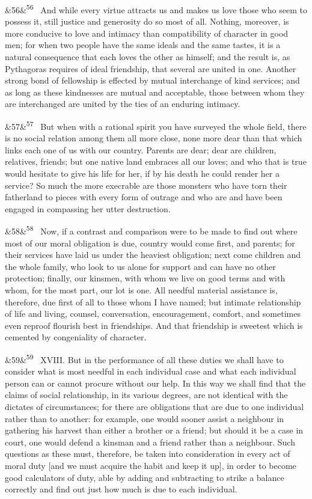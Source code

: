 \documentclass[12pt]{article}
\newcommand{\para}[1][]{\par\noindent\ifx&#1&\else\textsuperscript{\footnotesize #1}~\fi}
\begin{document}
\para[56] And while every virtue attracts us and makes us love those who seem to possess it, still justice and generosity do so most of all. Nothing, moreover, is more conducive to love and intimacy than compatibility of character in good men; for when two people have the same ideals and the same tastes, it is a natural consequence that each loves the other as himself; and the result is, as Pythagoras requires of ideal friendship, that several are united in one. Another strong bond of fellowship is effected by mutual interchange of kind services; and as long as these kindnesses are mutual and acceptable, those between whom they are interchanged are united by the ties of an enduring intimacy.

\para[57] But when with a rational spirit you have surveyed the whole field, there is no social relation among them all more close, none more dear than that which links each one of us with our country. Parents are dear; dear are children, relatives, friends; but one native land embraces all our loves; and who that is true would hesitate to give his life for her, if by his death he could render her a service? So much the more execrable are those monsters who have torn their fatherland to pieces with every form of outrage and who are and have been engaged in compassing her utter destruction.

\para[58] Now, if a contrast and comparison were to be made to find out where most of our moral obligation is due, country would come first, and parents; for their services have laid us under the heaviest obligation; next come children and the whole family, who look to us alone for support and can have no other protection; finally, our kinsmen, with whom we live on good terms and with whom, for the most part, our lot is one. All needful material assistance is, therefore, due first of all to those whom I have named; but intimate relationship of life and living, counsel, conversation, encouragement, comfort, and sometimes even reproof flourish best in friendships. And that friendship is sweetest which is cemented by congeniality of character.

\para[59] XVIII. But in the performance of all these duties we shall have to consider what is most needful in each individual case and what each individual person can or cannot procure without our help. In this way we shall find that the claims of social relationship, in its various degrees, are not identical with the dictates of circumstances; for there are obligations that are due to one individual rather than to another: for example, one would sooner assist a neighbour in gathering his harvest than either a brother or a friend; but should it be a case in court, one would defend a kinsman and a friend rather than a neighbour. Such questions as these must, therefore, be taken into consideration in every act of moral duty [and we must acquire the habit and keep it up], in order to become good calculators of duty, able by adding and subtracting to strike a balance correctly and find out just how much is due to each individual.
\end{document}
